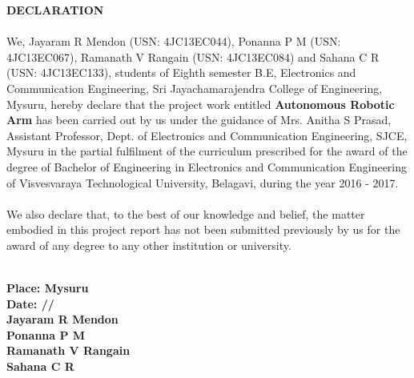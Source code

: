\begin{center}
\thispagestyle{plain}
\LARGE{\textbf{DECLARATION}}\\[1cm]
\end{center}
\linespread{1.13}
\large{\paragraph{}We, Jayaram R Mendon (USN: 4JC13EC044), Ponanna P M (USN: 4JC13EC067), Ramanath V Rangain (USN: 4JC13EC084) and Sahana C R (USN: 4JC13EC133), students of Eighth semester B.E, Electronics and Communication Engineering, Sri Jayachamarajendra College of Engineering, Mysuru, hereby declare that the project work entitled \textbf{Autonomous Robotic Arm} has been carried out by us under the guidance of Mrs. Anitha S Prasad, Assistant Professor, Dept. of Electronics and Communication Engineering, SJCE, Mysuru in the partial fulfilment of the curriculum prescribed for the award of the degree of Bachelor of Engineering in Electronics and  Communication Engineering of Visvesvaraya Technological University, Belagavi, during the year 2016 - 2017.
\paragraph{}We also declare that, to the best of our knowledge and belief, the matter embodied in this project report has not been submitted previously by us for the award of any degree to any other institution or university.}
\vspace{1.0cm}\\
\textbf{{Place: Mysuru}}\\
\textbf{Date: \hspace*{1.0cm}/\hspace*{1.0cm}/}
\vspace{1.2cm}\\
\textbf{Jayaram R Mendon}
\vspace{1.2cm}\\
\textbf{Ponanna P M}
\vspace{1.2cm}\\
\textbf{Ramanath V Rangain}
\vspace{1.2cm}\\
\textbf{Sahana C R}
\newpage
